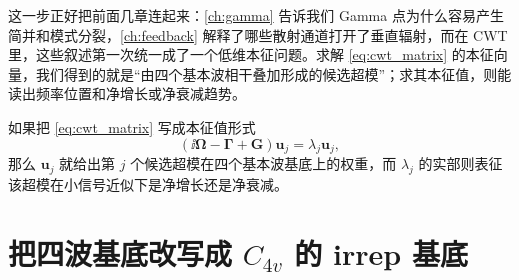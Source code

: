 这一步正好把前面几章连起来：\cref{ch:gamma} 告诉我们 Gamma 点为什么容易产生简并和模式分裂，\cref{ch:feedback} 解释了哪些散射通道打开了垂直辐射，而在 CWT 里，这些叙述第一次统一成了一个低维本征问题。求解 \cref{eq:cwt_matrix} 的本征向量，我们得到的就是“由四个基本波相干叠加形成的候选超模”；求其本征值，则能读出频率位置和净增长或净衰减趋势。

如果把 \cref{eq:cwt_matrix} 写成本征值形式
\begin{equation}
\left(\ii\bm{\Omega}-\bm{\Gamma}+\bm{G}\right)\bm{u}_j
=
\lambda_j\bm{u}_j,
\label{eq:cwt_eig}
\end{equation}
那么 $\bm{u}_j$ 就给出第 $j$ 个候选超模在四个基本波基底上的权重，而 $\lambda_j$ 的实部则表征该超模在小信号近似下是净增长还是净衰减。

\section{把四波基底改写成 \texorpdfstring{$C_{4v}$}{C4v} 的 irrep 基底}
